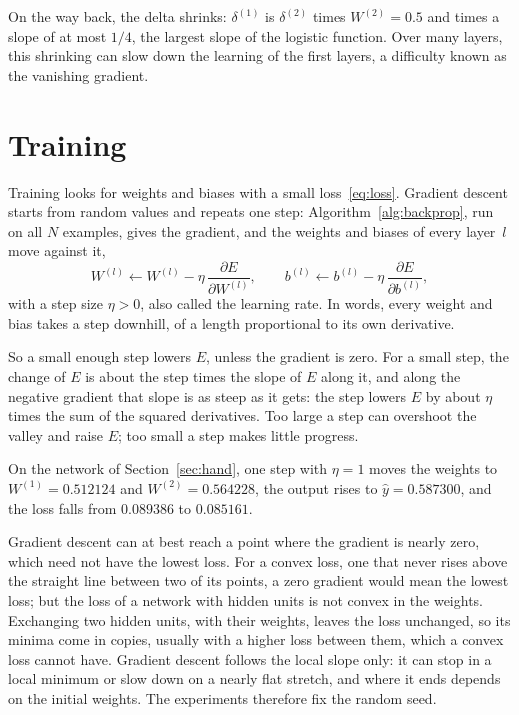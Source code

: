 \documentclass[11pt,a4paper]{amsart}
\numberwithin{equation}{section}
\theoremstyle{plain}
\theoremstyle{definition}
\theoremstyle{remark}
\begin{document}
On the way back, the delta shrinks: $\delta^{(1)}$ is $\delta^{(2)}$
times $W^{(2)} = 0.5$ and times a slope of at most $1/4$, the largest
slope of the logistic function. Over many layers, this shrinking can
slow down the learning of the first layers, a difficulty known as the
vanishing gradient.

\section{Training}\label{sec:training}

Training looks for weights and biases with a small loss~\eqref{eq:loss}.
Gradient descent starts from random values and repeats one step:
Algorithm~\ref{alg:backprop}, run on all $N$ examples, gives the
gradient, and the weights and biases of every layer~$l$ move against it,
\begin{equation}\label{eq:gd}
  W^{(l)} \gets W^{(l)} - \eta\, \frac{\partial E}{\partial W^{(l)}},
  \qquad
  b^{(l)} \gets b^{(l)} - \eta\, \frac{\partial E}{\partial b^{(l)}},
\end{equation}
with a step size $\eta > 0$, also called the learning rate. In words,
every weight and bias takes a step downhill, of a length proportional to
its own derivative.

So a small enough step lowers $E$, unless the gradient is zero. For a
small step, the change of $E$ is about the step times the slope of $E$
along it, and along the negative gradient that slope is as steep as it
gets: the step lowers $E$ by about $\eta$ times the sum of the squared
derivatives. Too large a step can overshoot the valley and raise $E$;
too small a step makes little progress.

On the network of Section~\ref{sec:hand}, one step with $\eta = 1$
moves the weights to $W^{(1)} = 0.512124$ and $W^{(2)} = 0.564228$, the
output rises to $\hat y = 0.587300$, and the loss falls from $0.089386$
to $0.085161$.

Gradient descent can at best reach a point where the gradient is nearly
zero, which need not have the lowest loss. For a convex loss, one that
never rises above the straight line between two of its points, a zero
gradient would mean the lowest loss; but the loss of a network with
hidden units is not convex in the weights. Exchanging two hidden units,
with their weights, leaves the loss unchanged, so its minima come in
copies, usually with a higher loss between them, which a convex loss
cannot have. Gradient descent follows the local slope only: it can stop
in a local minimum or slow down on a nearly flat stretch, and where it
ends depends on the initial weights. The experiments therefore fix the
random seed.
\end{document}
